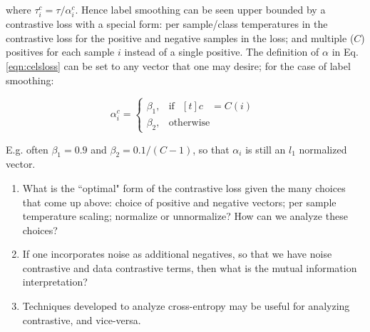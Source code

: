 \documentclass[10pt,letterpaper]{article}
\begin{document}
where $\tau_i^c = \tau/\alpha_i^c$. Hence label smoothing can be seen upper bounded by a contrastive loss with a special form: per sample/class temperatures in the contrastive loss for the positive and negative samples in the loss; and multiple ($C$) positives for each sample $i$ instead of a single positive. The definition of $\alpha$ in Eq. \ref{eqn:celsloss} can be set to any vector that one may desire; for the case of label smoothing:

\begin{equation}
\alpha_i^c =
\begin{cases}
  \beta_1, & \text{if }
       \!\begin{aligned}[t]
       c &= C(i)
       \end{aligned}
\\
  \beta_2, & \text{otherwise}
\end{cases}
\label{eqn:alpha}
\end{equation}

E.g. often $\beta_1 = 0.9$ and $\beta_2 = 0.1/(C - 1)$, so that $\alpha_i$ is still an \emph{$l_1$} normalized vector. 

\begin{enumerate}
\item What is the ``optimal" form of the contrastive loss given the many choices that come up above: choice of positive and negative vectors; per sample temperature scaling; normalize or unnormalize? How can we analyze these choices? 

\item If one incorporates noise as additional negatives, so that we have noise contrastive and data contrastive terms, then what is the mutual information interpretation?

\item Techniques developed to analyze cross-entropy may be useful for analyzing contrastive, and vice-versa. 

\end{enumerate}
\end{document}
